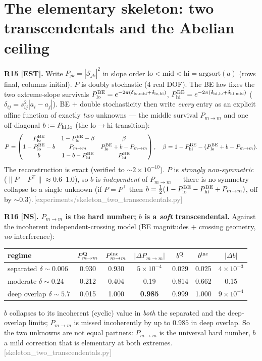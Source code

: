 \documentclass[aps,prd,reprint,nofootinbib]{revtex4-2}
\newcommand{\pnote}[1]{\textcolor{gray}{\footnotesize\,[#1]}}
\newcommand{\Scat}{\mathcal{S}}   %
\newcommand{\Pmid}{P_{m\to m}}   %
\newcommand{\BE}{\mathrm{BE}}
\begin{document}
\section{The elementary skeleton: two transcendentals and the Abelian ceiling}\label{sec:skeleton}
\textbf{R15 [EST].} Write $P_{jk}=|\Scat_{jk}|^2$ in slope order $\mathrm{lo}<\mathrm{mid}<\mathrm{hi}=
\mathrm{argsort}(a)$ (rows final, columns initial). $P$ is doubly stochastic ($4$ real DOF). The BE law
fixes the two extreme-slope survivals $P^{\BE}_{\rm lo}=e^{-2\pi(\delta_{\rm lo,mid}+\delta_{\rm lo,hi})}$,
$P^{\BE}_{\rm hi}=e^{-2\pi(\delta_{\rm hi,lo}+\delta_{\rm hi,mid})}$ ($\delta_{ij}=s_{ij}^2|a_i-a_j|$). BE
$+$ double stochasticity then write \emph{every} entry as an explicit affine function of exactly
\emph{two} unknowns --- the middle survival $\Pmid$ and one off-diagonal $b:=P_{\rm hi,lo}$
(the $\mathrm{lo}\!\to\!\mathrm{hi}$ transition):
\begin{equation}
P=\begin{pmatrix}
P^{\BE}_{\rm lo} & 1-P^{\BE}_{\rm lo}-\beta & \beta\\[2pt]
1-P^{\BE}_{\rm lo}-b & \Pmid & P^{\BE}_{\rm lo}+b-\Pmid\\[2pt]
b & 1-b-P^{\BE}_{\rm hi} & P^{\BE}_{\rm hi}
\end{pmatrix},\quad \beta=1-P^{\BE}_{\rm hi}-(P^{\BE}_{\rm lo}+b-\Pmid).
\end{equation}
The reconstruction is exact (verified to $\sim2\times10^{-10}$). $P$ is \emph{strongly non-symmetric}
($\|P-P^\top\|\approx0.6$--$1.0$), so $b$ is \emph{independent} of $\Pmid$ --- there is no symmetry
collapse to a single unknown (if $P=P^\top$ then $b=\tfrac12(1-P^{\BE}_{\rm lo}-P^{\BE}_{\rm hi}+\Pmid)$,
off by $\sim0.3$).\pnote{experiments/skeleton\_two\_transcendentals.py}

\textbf{R16 [NS]. $\Pmid$ is the hard number; $b$ is a \emph{soft} transcendental.} Against the
incoherent independent-crossing model (BE magnitudes $+$ crossing geometry, \emph{no} interference):
\begin{center}\small
\begin{tabular}{lccc|ccc}
\toprule
regime & $\Pmid^{\rm Q}$ & $\Pmid^{\rm inc}$ & $|\Delta\Pmid|$ & $b^{\rm Q}$ & $b^{\rm inc}$ & $|\Delta b|$\\
\midrule
separated $\delta\!\sim\!0.006$ & 0.930 & 0.930 & $5\!\times\!10^{-4}$ & 0.029 & 0.025 & $4\!\times\!10^{-3}$\\
moderate $\delta\!\sim\!0.24$ & 0.212 & 0.404 & 0.19 & 0.814 & 0.662 & 0.15\\
deep overlap $\delta\!\sim\!5.7$ & 0.015 & 1.000 & \textbf{0.985} & 0.999 & 1.000 & $9\!\times\!10^{-4}$\\
\bottomrule
\end{tabular}
\end{center}
$b$ collapses to its incoherent (cyclic) value in \emph{both} the separated and the deep-overlap limits;
$\Pmid$ is missed incoherently by up to $0.985$ in deep overlap. So the two unknowns are not equal
partners: $\Pmid$ is the universal hard number, $b$ a mild correction that is elementary at both
extremes.\pnote{skeleton\_two\_transcendentals.py}
\end{document}

